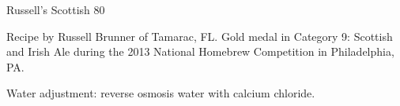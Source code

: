 \begin{recipe}{Russell's Scottish 80}

\begin{aboutblock}
Recipe by Russell Brunner of Tamarac, FL. Gold medal in Category 9: Scottish
and Irish Ale during the 2013 National Homebrew Competition in Philadelphia, PA.
\sourceaha
\end{aboutblock}


\begin{methodandtiming}

\begin{mashsteps}
\end{mashsteps}

\begin{fermentationsteps}
\end{fermentationsteps}

\begin{directions}
Water adjustment: reverse osmosis water with  calcium chloride.
\end{directions}

\end{methodandtiming}

\recipebreak

\begin{ingredientsblock}

\begin{malts}
\end{malts}

\begin{hops}
\end{hops}


\end{ingredientsblock}

\end{recipe}

